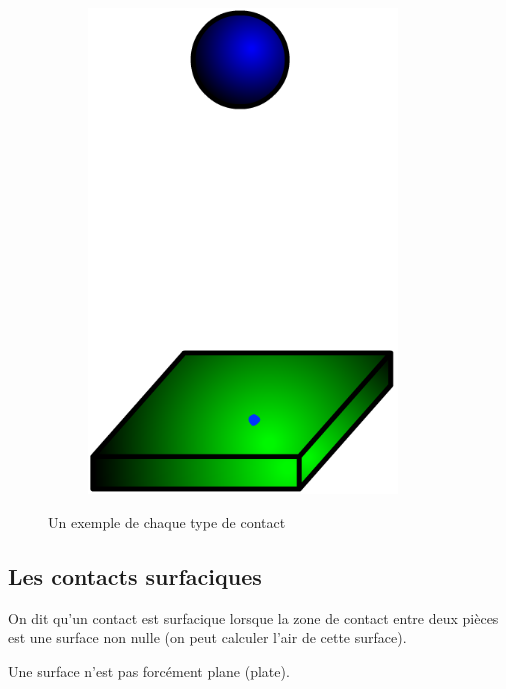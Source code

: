 \documentclass[10pt,fleqn]{article} %
\begin{document}
\begin{figure}[h]
\begin{subfigure}[b]{0.3\textwidth}
    \includegraphics[width=0.9\textwidth,height=.2\textheight,keepaspectratio]{images/sphere-plan}
    \caption{}
  \end{subfigure}\hfill
  \caption{Un exemple de chaque type de contact}
  \label{fig:type_contact}
\end{figure}
\subsection{Les contacts surfaciques}

\begin{defi}
  On dit qu'un contact est surfacique lorsque la zone de contact entre deux pièces est une surface non nulle (on peut calculer l'air de cette surface).
\end{defi}

\begin{warn}
  Une surface n'est pas forcément plane (plate).
\end{warn}
\end{document}
